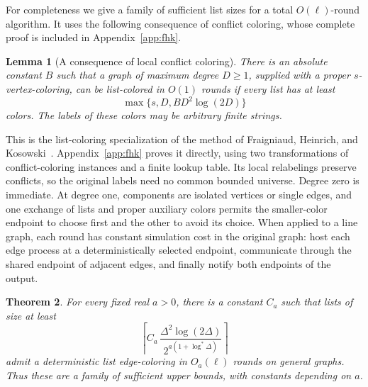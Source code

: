 \documentclass[11pt]{article}
\newtheorem{theorem}{Theorem}[section]
\newtheorem{lemma}[theorem]{Lemma}
\theoremstyle{definition}
\theoremstyle{remark}
\begin{document}
For completeness we give a family of sufficient list sizes for a total
$O(\ell)$-round algorithm.  It uses the following consequence of conflict coloring, whose complete proof is included in Appendix~\ref{app:fhk}.

\begin{lemma}[A consequence of local conflict coloring]
\label{lem:fhkfinish}
There is an absolute constant $B$ such that a graph of maximum degree
$D\ge1$, supplied with a proper $s$-vertex-coloring, can be list-colored
in $O(1)$ rounds if every list has at least
\[
 \max\{s,D,B D^2\log(2D)\}
\]
colors.  The labels of these colors may be arbitrary finite strings.
\end{lemma}

This is the list-coloring specialization of the method of
Fraigniaud, Heinrich, and Kosowski~\cite[Lemma 3.3]{FHK}.
Appendix~\ref{app:fhk} proves it directly, using two transformations of
conflict-coloring instances and a finite lookup table. Its local
relabelings preserve conflicts, so the original labels need no common
bounded universe. Degree zero is immediate. At degree one, components
are isolated vertices or single edges, and one exchange of lists and
proper auxiliary colors permits the smaller-color endpoint to choose
first and the other to avoid its choice. When applied to a line graph,
each round has constant simulation cost in the original graph: host
each edge process at a deterministically selected endpoint, communicate
through the shared endpoint of adjacent edges, and finally notify both
endpoints of the output.

\begin{theorem}\label{thm:generalshorttime}
For every fixed real $a>0$, there is a constant $C_a$ such that lists of
size at least
\[
 \left\lceil C_a\,
   \frac{\Delta^2\log(2\Delta)}{2^{a(1+\log^*\Delta)}}\right\rceil
\]
admit a deterministic list edge-coloring in $O_a(\ell)$ rounds on
general graphs.  Thus these are a family of sufficient upper bounds,
with constants depending on $a$.
\end{theorem}
\end{document}
